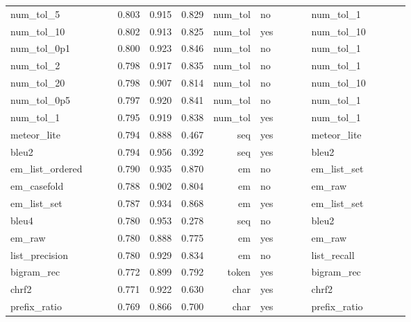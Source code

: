 \begin{longtable}{p{0.278\linewidth}rrrrp{0.134\linewidth}p{0.259\linewidth}}
num\_\allowbreak{}tol\_\allowbreak{}5 & 0.803 & 0.915 & 0.829 & num\_\allowbreak{}tol & no & num\_\allowbreak{}tol\_\allowbreak{}1 \\
num\_\allowbreak{}tol\_\allowbreak{}10 & 0.802 & 0.913 & 0.825 & num\_\allowbreak{}tol & yes & num\_\allowbreak{}tol\_\allowbreak{}10 \\
num\_\allowbreak{}tol\_\allowbreak{}0p1 & 0.800 & 0.923 & 0.846 & num\_\allowbreak{}tol & no & num\_\allowbreak{}tol\_\allowbreak{}1 \\
num\_\allowbreak{}tol\_\allowbreak{}2 & 0.798 & 0.917 & 0.835 & num\_\allowbreak{}tol & no & num\_\allowbreak{}tol\_\allowbreak{}1 \\
num\_\allowbreak{}tol\_\allowbreak{}20 & 0.798 & 0.907 & 0.814 & num\_\allowbreak{}tol & no & num\_\allowbreak{}tol\_\allowbreak{}10 \\
num\_\allowbreak{}tol\_\allowbreak{}0p5 & 0.797 & 0.920 & 0.841 & num\_\allowbreak{}tol & no & num\_\allowbreak{}tol\_\allowbreak{}1 \\
num\_\allowbreak{}tol\_\allowbreak{}1 & 0.795 & 0.919 & 0.838 & num\_\allowbreak{}tol & yes & num\_\allowbreak{}tol\_\allowbreak{}1 \\
meteor\_\allowbreak{}lite & 0.794 & 0.888 & 0.467 & seq & yes & meteor\_\allowbreak{}lite \\
bleu2 & 0.794 & 0.956 & 0.392 & seq & yes & bleu2 \\
em\_\allowbreak{}list\_\allowbreak{}ordered & 0.790 & 0.935 & 0.870 & em & no & em\_\allowbreak{}list\_\allowbreak{}set \\
em\_\allowbreak{}casefold & 0.788 & 0.902 & 0.804 & em & no & em\_\allowbreak{}raw \\
em\_\allowbreak{}list\_\allowbreak{}set & 0.787 & 0.934 & 0.868 & em & yes & em\_\allowbreak{}list\_\allowbreak{}set \\
bleu4 & 0.780 & 0.953 & 0.278 & seq & no & bleu2 \\
em\_\allowbreak{}raw & 0.780 & 0.888 & 0.775 & em & yes & em\_\allowbreak{}raw \\
list\_\allowbreak{}precision & 0.780 & 0.929 & 0.834 & em & no & list\_\allowbreak{}recall \\
bigram\_\allowbreak{}rec & 0.772 & 0.899 & 0.792 & token & yes & bigram\_\allowbreak{}rec \\
chrf2 & 0.771 & 0.922 & 0.630 & char & yes & chrf2 \\
prefix\_\allowbreak{}ratio & 0.769 & 0.866 & 0.700 & char & yes & prefix\_\allowbreak{}ratio \\

\end{longtable}
